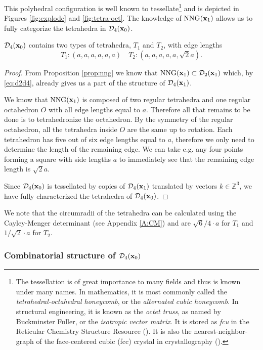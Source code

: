 This polyhedral configuration is well known to tessellate\footnote{ The tessellation is of great importance to many fields and thus is known under many names. In mathematics, it is most commonly called the \textit{tetrahedral-octahedral honeycomb}, or the \textit{alternated cubic honeycomb}. In structural engineering, it is known as the \textit{octet truss}, as named by Buckminster Fuller, or the \textit{isotropic vector matrix}. It is stored as \textit{fcu} in the Reticular Chemistry Structure Resource (\cite{RCSR}). It is also the nearest-neighbor-graph of the face-centered cubic (fcc) crystal in crystallography (\cite{Gabbrielli12}).  } and is depicted in Figures \ref{fig:explode} and \ref{fig:tetra-oct}. The knowledge of $\mathrm{NNG}({\mathbf{x}}_1)$ allows us to fully categorize the tetrahedra in $\mathcal D_4({\mathbf{x}}_0)$.

\begin{proposition}\label{prop:tetraInTess} $\mathcal D_4({\mathbf{x}}_0)$ contains two types of tetrahedra, $T_1$ and $T_2$, with edge lengths
	$$T_1:(a,a,a,a,a,a) \quad T_2:(a,a,a,a,a,\sqrt 2a). $$
\end{proposition}
\begin{proof}
	From Proposition \ref{prop:nng} we know that $\mathrm{NNG}({\mathbf{x}}_1) \subset \mathcal D_2({\mathbf{x}}_1)$ which, by \eqref{eq:d2d4}, already gives us a part of the structure of $\mathcal D_4({\mathbf{x}}_1)$. 

We know that $\text{NNG}({\mathbf{x}}_1)$ is composed of two regular tetrahedra and one regular octahedron $O$ with all edge lengths equal to $a$. Therefore all that remains to be done is to tetrahedronize the octahedron. By the symmetry of the regular octahedron, all the tetrahedra inside $O$ are the same up to rotation. Each tetrahedron has five out of six edge lengths equal to $a$, therefore we only need to determine the length of the remaining edge. We can take e.g. any four points forming a square with side lengths $a$ to immediately see that the remaining edge length is $\sqrt 2a$.

Since $\mathcal D_4({\mathbf{x}}_0)$ is tessellated by copies of $\mathcal D_4({\mathbf{x}}_1)$ translated by vectors $k\in\mathbb Z^3$, we have fully characterized the tetrahedra of $\mathcal D_4({\mathbf{x}}_0)$. 
\end{proof}

We note that the circumradii of the tetrahedra can be calculated using the Cayley-Menger determinant (see Appendix \ref{A:CM}) and are $\sqrt{6}/4 \cdot a$ for $T_1$ and $1/\sqrt{2}\cdot a$ for $T_2$.

\subsubsection{Combinatorial structure of $\mathcal D_4({\mathbf{x}}_0)$}\label{sec:combinatorial}

